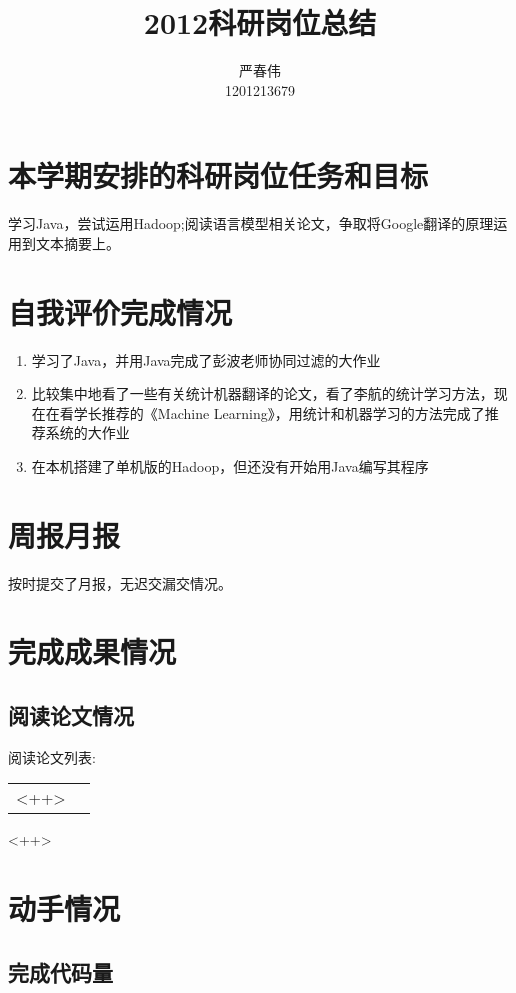 \documentclass[a4paper]{ctexart}
\author{严春伟\\
    1201213679}
\title{2012科研岗位总结}
\begin{document}
    \maketitle
    \section{本学期安排的科研岗位任务和目标}
    学习Java，尝试运用Hadoop;阅读语言模型相关论文，争取将Google翻译的原理运用到文本摘要上。

    \section{自我评价完成情况}
    \begin{enumerate}
        \item 学习了Java，并用Java完成了彭波老师协同过滤的大作业
        \item 比较集中地看了一些有关统计机器翻译的论文，看了李航的统计学习方法，现在在看学长推荐的《Machine Learning》，用统计和机器学习的方法完成了推荐系统的大作业
        \item 在本机搭建了单机版的Hadoop，但还没有开始用Java编写其程序
    \end{enumerate}

    \section{周报月报}
    按时提交了月报，无迟交漏交情况。

    \section{完成成果情况}
    \subsection{阅读论文情况}
    \par 阅读论文列表:
    \begin{tabular}[]{l|l}
        <++>
    \end{tabular}<++>

    \section{动手情况}
    \subsection{完成代码量}
\end{document}
